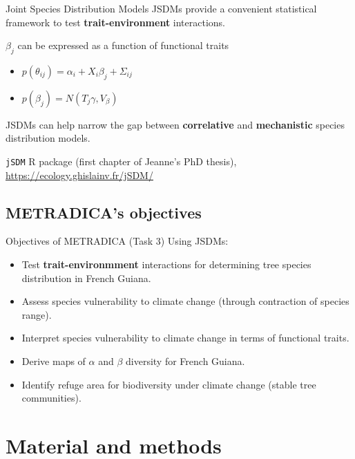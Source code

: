 \documentclass[
  10pt,
  ignorenonframetext,
  table, dvipsname, compress]{beamer}
\providecommand{\tightlist}{%
  \setlength{\itemsep}{0pt}\setlength{\parskip}{0pt}}
\begin{document}
\begin{frame}[fragile]{Joint Species Distribution Models}
\protect\hypertarget{joint-species-distribution-models}{}
JSDMs provide a convenient statistical framework to test
\textbf{trait-environment} interactions.

\(\beta_j\) can be expressed as a function of functional traits

\begin{itemize}
\tightlist
\item
  \(p(\theta_{ij}) = \alpha_i + X_i \beta_j + \Sigma_{ij}\)
\item
  \(p(\beta_j) = N(T_j \gamma, V_{\beta})\)
\end{itemize}

JSDMs can help narrow the gap between \textbf{correlative} and
\textbf{mechanistic} species distribution models.

\texttt{jSDM} R package (first chapter of Jeanne's PhD thesis),
\url{https://ecology.ghislainv.fr/jSDM/}
\end{frame}

\hypertarget{metradicas-objectives}{%
\subsection{METRADICA's objectives}\label{metradicas-objectives}}

\begin{frame}{Objectives of METRADICA (Task 3)}
\protect\hypertarget{objectives-of-metradica-task-3}{}
Using JSDMs:

\begin{itemize}
\tightlist
\item
  Test \textbf{trait-environmment} interactions for determining tree
  species distribution in French Guiana.
\item
  Assess species vulnerability to climate change (through contraction of
  species range).
\item
  Interpret species vulnerability to climate change in terms of
  functional traits.
\item
  Derive maps of \(\alpha\) and \(\beta\) diversity for French Guiana.
\item
  Identify refuge area for biodiversity under climate change (stable
  tree communities).
\end{itemize}
\end{frame}

\hypertarget{material-and-methods}{%
\section{Material and methods}\label{material-and-methods}}
\end{document}
